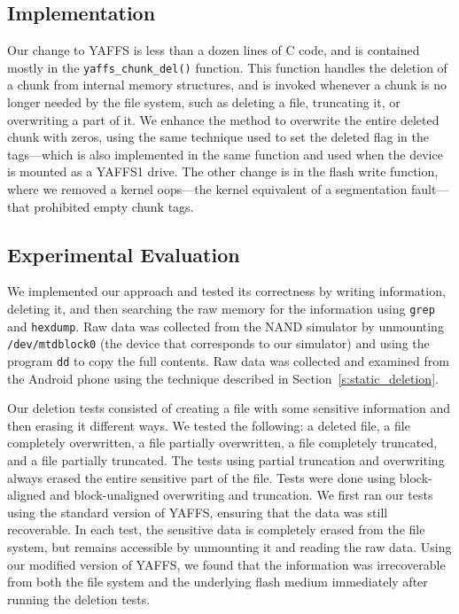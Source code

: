 \documentclass{acmtog}
\begin{document}
\subsection{Implementation} 
Our change to YAFFS is less than a dozen lines of C code, and is 
contained mostly in the \texttt{yaffs\_chunk\_del()} function. This function handles
the deletion of a chunk from internal memory structures, and is invoked
whenever a chunk is  no longer needed by the file system, such as deleting
a file, truncating it, or overwriting a part of it. We enhance the
method to overwrite the entire deleted chunk with zeros, using the same technique used
to set the deleted flag in the tags---which is also implemented in the same
function and used when the device is mounted as a YAFFS1 drive. The other
change is in the flash write function, where we removed a kernel oops---the
kernel equivalent of a segmentation fault---that
prohibited empty chunk tags. 


\subsection{Experimental Evaluation}

We implemented  our  approach and tested its correctness by writing information,
deleting it, and then searching the raw memory for the information using
 \texttt{grep} and \texttt{hexdump}. Raw data was collected from the NAND simulator by unmounting
\texttt{/dev/mtdblock0} (the device that corresponds to our simulator) and
using the program \texttt{dd} to copy the full contents. 
Raw data was collected and examined from the Android phone using the 
technique described in Section~\ref{s:static_deletion}.

Our deletion tests consisted of creating a file with some sensitive
information and then erasing it  different ways. We tested the following: a deleted file, a file
completely overwritten, a file partially overwritten, a file
completely truncated, and a file partially truncated. The tests using partial
truncation and overwriting always erased the entire sensitive part of the file. Tests were done using
block-aligned and block-unaligned overwriting and truncation. 
We first ran our tests using the standard version of YAFFS, ensuring that the
data was still recoverable. In each test, the sensitive data is completely
erased from the file system, but remains accessible by unmounting it and
reading the raw data.  Using our modified version of YAFFS, we found that the
information was irrecoverable from both the file system and the underlying
flash medium immediately after running the deletion tests. 
\end{document}
